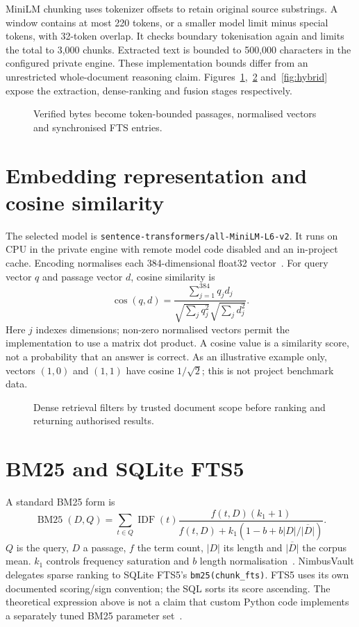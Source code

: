 \documentclass[11pt,a4paper,oneside]{report}
\newcommand{\ShortCaption}[1]{\csname ShortCaption#1\endcsname}
\newcommand{\diagram}[3]{\par\begin{figure}[htbp]\centering\sbox{\DiagramBox}{}\ifdim\wd\DiagramBox>\linewidth\resizebox{\linewidth}{!}{\usebox{\DiagramBox}}\else\usebox{\DiagramBox}\fi\caption[\ShortCaption{#1}]{#2}\label{fig:#3}\end{figure}\par}
\begin{document}
MiniLM chunking uses tokenizer offsets to retain original source substrings. A window contains at most 220 tokens, or a smaller model limit minus special tokens, with 32-token overlap. It checks boundary tokenisation again and limits the total to 3,000 chunks. Extracted text is bounded to 500,000 characters in the configured private engine. These implementation bounds differ from an unrestricted whole-document reasoning claim.
Figures~\ref{fig:embedding},~\ref{fig:dense} and~\ref{fig:hybrid} expose the extraction, dense-ranking and fusion stages respectively.
\diagram{embedding}{Verified bytes become token-bounded passages, normalised vectors and synchronised FTS entries.}{embedding}
\section{Embedding representation and cosine similarity}
The selected model is \texttt{sentence-transformers/all-MiniLM-L6-v2}. It runs on CPU in the private engine with remote model code disabled and an in-project cache. Encoding normalises each 384-dimensional float32 vector~\cite{minilmcard}. For query vector $q$ and passage vector $d$, cosine similarity is
\begin{equation}\operatorname{cos}(q,d)=\frac{\sum_{j=1}^{384}q_jd_j}{\sqrt{\sum_jq_j^2}\sqrt{\sum_jd_j^2}}.\end{equation}
Here $j$ indexes dimensions; non-zero normalised vectors permit the implementation to use a matrix dot product. A cosine value is a similarity score, not a probability that an answer is correct. As an illustrative example only, vectors $(1,0)$ and $(1,1)$ have cosine $1/\sqrt{2}$; this is not project benchmark data.
\diagram{dense_search}{Dense retrieval filters by trusted document scope before ranking and returning authorised results.}{dense}
\section{BM25 and SQLite FTS5}
A standard BM25 form is
\begin{equation}\operatorname{BM25}(D,Q)=\sum_{t\in Q}\operatorname{IDF}(t)\frac{f(t,D)(k_1+1)}{f(t,D)+k_1(1-b+b|D|/\overline{|D|})}.\end{equation}
$Q$ is the query, $D$ a passage, $f$ the term count, $|D|$ its length and $\overline{|D|}$ the corpus mean. $k_1$ controls frequency saturation and $b$ length normalisation~\cite{bm25}. NimbusVault delegates sparse ranking to SQLite FTS5's \texttt{bm25(chunk\_fts)}. FTS5 uses its own documented scoring/sign convention; the SQL sorts its score ascending. The theoretical expression above is not a claim that custom Python code implements a separately tuned BM25 parameter set~\cite{sqlitefts}.
\end{document}
